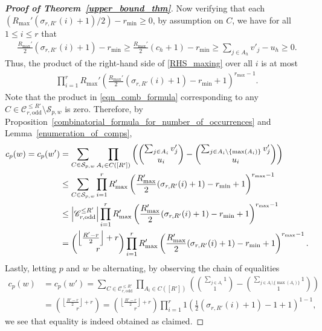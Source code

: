 \documentclass[11pt]{amsart}
\begin{document}
\begin{proof}[\textbf{Proof of Theorem~\ref{upper_bound_thm}}]
    Now verifying that each $(R_{\max}'(\sigma_{r,R'}(i)+1)/2)-r_{\min}\geq0$, by assumption on $C$, we have for all $1\leq i\leq r$ that
    \begin{align*}
        \frac{R_{\max}'}{2}(\sigma_{r,R'}(i)+1)-r_{\min}
        \geq\frac{R_{\max}'}{2}(c_h+1)-r_{\min} \geq \sum_{j\in A_h}v'_{j}-u_h\geq 0.
    \end{align*}
    Thus, the product of the right-hand side of \eqref{RHS_maxing} over all $i$ is at most
    \begin{align*}
        \prod_{i=1}^{r}R_{\max}'\left(\frac{R_{\max}'}{2}(\sigma_{r,R'}(i)+1)-r_{\min}+1\right)^{r_{\max}-1}.
    \end{align*}
    Note that the product in \eqref{eqn_comb_formula} corresponding to any $C\in\mathscr{C}_{r,\text{odd}}^{\leq R'}\setminus\mathcal{S}_{p,w}$ is zero. Therefore, by Proposition~\ref{combinatorial_formula_for_number_of_occurrences} and Lemma~\ref{enumeration_of_comps},
    \begin{align*}
        c_p(w)=c_p(w')&=\sum_{C\in\mathcal{S}_{p,w}}\prod_{A_i\in C([R'])}\left({\sum_{j\in A_i}v'_{j}\choose u_i}-{\sum_{j\in A_i\setminus\{\max(A_i)\}}v'_{j}\choose u_i}\right)\\
        &\leq \sum_{C\in\mathcal{S}_{p,w}}\prod_{i=1}^{r}R_{\max}'\left(\frac{R_{\max}'}{2}(\sigma_{r,R'}(i)+1)-r_{\min}+1\right)^{r_{\max}-1}\\
        &\leq\left|\mathscr{C}_{r,\text{\normalfont odd}}^{\leq R'}\right|\prod_{i=1}^{r}R_{\max}'\left(\frac{R_{\max}'}{2}(\sigma_{r,R'}(i)+1)-r_{\min}+1\right)^{r_{\max}-1}\\
        &={\left\lfloor\frac{R'-r}{2}\right\rfloor+r\choose r}\prod_{i=1}^{r}R_{\max}'\left(\frac{R_{\max}'}{2}(\sigma_{r,R'}(i)+1)-r_{\min}+1\right)^{r_{\max}-1}.
    \end{align*}
    Lastly, letting $p$ and $w$ be alternating, by observing the chain of equalities
    \begin{align*}
        c_p(w)&=c_p(w')=\sum_{C\in\mathscr{C}_{r,\text{odd}}^{\leq R'}}\prod_{A_i\in C([R'])}\left({\sum_{j\in A_i}1\choose 1}-{\sum_{j\in A_i\setminus\{\max(A_i)\}}1\choose 1}\right)\\
        &={\left\lfloor\frac{R'-r}{2}\right\rfloor+r\choose r}={\left\lfloor\frac{R'-r}{2}\right\rfloor+r\choose r}\prod_{i=1}^{r}1\left(\frac{1}{2}(\sigma_{r,R'}(i)+1)-1+1\right)^{1-1},
    \end{align*}
    we see that equality is indeed obtained as claimed.
\end{proof}
\end{document}
